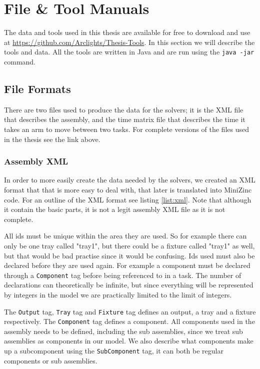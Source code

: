 \chapter{File \& Tool Manuals}\label{app:tool_manuals}
The data and tools used in this thesis are available for free to download and use at \url{https://github.com/Arclights/Thesis-Tools}. In this section we will describe the tools and data. All the tools are written in Java and are run using the \texttt{java -jar} command.

\section{File Formats}
There are two files used to produce the data for the solvers; it is the XML file that describes the assembly, and the time matrix file that describes the time it takes an arm to move between two tasks. For complete versions of the files used in the thesis see the link above.
\subsection{Assembly XML}\label{sec:xml}
In order to more easily create the data needed by the solvers, we created an XML format that that is more easy to deal with, that later is translated into MiniZinc code. For an outline of the XML format see listing \ref{list:xml}. Note that although it contain the basic parts, it is not a legit assembly XML file as it is not complete.

All ids must be unique within the area they are used. So for example there can only be one tray called "tray1", but there could be a fixture called "tray1" as well, but that would be bad practise since it would be confusing. Ids used must also be declared before they are used again. For example a component must be declared through a \texttt{Component} tag before being referenced to in a task. The number of declarations can theoretically be infinite, but since everything will be represented by integers in the model we are practically limited to the limit of integers.

The \texttt{Output} tag, \texttt{Tray} tag and \texttt{Fixture} tag defines an output, a tray and a fixture respectively. The \texttt{Component} tag defines a component. All components used in the assembly needs to be defined, including the sub assemblies, since we treat sub assemblies as components in our model. We also describe what components make up a subcomponent using the \texttt{SubComponent} tag, it can both be regular components or sub assemblies.

